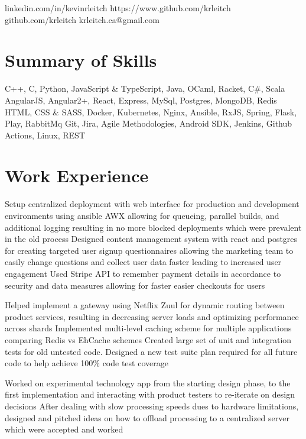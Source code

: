 \documentclass{my_resume}
\begin{document}
        {linkedin.com/in/kevinrleitch}
        {https://www.github.com/krleitch}
        {github.com/krleitch}
        {krleitch.ca@gmail.com}

\section{Summary of Skills}
{C++, C, Python, JavaScript \& TypeScript, Java, OCaml, Racket, C\#, Scala}
{AngularJS, Angular2+, React, Express, MySql, Postgres, MongoDB, Redis HTML,
 CSS \& SASS, Docker, Kubernetes, Nginx, Ansible, RxJS, Spring, Flask, Play, RabbitMq}
{Git, Jira, Agile Methodologies, Android SDK, Jenkins, Github Actions, Linux, REST}

\section{Work Experience}

\workitemsthree
{Setup centralized deployment with web interface for production and development environments using ansible AWX allowing for queueing,
 parallel builds, and additional logging resulting in no more blocked deployments which were prevalent in the old process}
{Designed content management system with react and postgres for creating targeted user signup questionnaires allowing the marketing team
 to easily change questions and collect user data faster leading to increased user engagement}
{Used Stripe API to remember payment details in accordance to security and data measures allowing for faster easier checkouts for users}

\workitemsthree
{Helped implement a gateway using Netflix Zuul for dynamic routing between product services,
 resulting in decreasing server loads and optimizing performance across shards}
{Implemented multi-level caching scheme for multiple applications comparing Redis vs EhCache schemes}
{Created large set of unit and integration tests for old untested code.
 Designed a new test suite plan required for all future code to help achieve 100\% code test coverage}

\workitemstwo
{Worked on experimental technology app from the starting design phase, to the first implementation and interacting
with product testers to re-iterate on design decisions}
{After dealing with slow processing speeds dues to hardware limitations, designed and pitched ideas on how to offload
processing to a centralized server which were accepted and worked }
\end{document}
